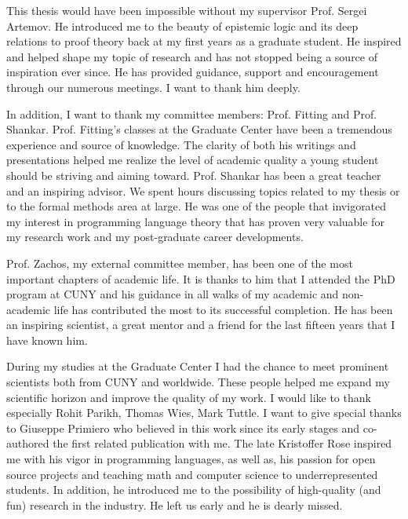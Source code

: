 This thesis would have been impossible without my supervisor Prof. Sergei Artemov.
He introduced me to the beauty of epistemic logic and its deep relations to proof theory
back at my first years as a graduate student. He inspired and helped shape my topic of research and 
has not stopped being a source of inspiration ever
since. He has provided guidance, support and encouragement through our numerous meetings. 
I want to thank him deeply.

In addition, I want to thank my committee members: Prof. Fitting and Prof. Shankar. Prof. Fitting's classes
 at the Graduate Center have been a tremendous experience and source of knowledge.
The clarity of  both his writings and presentations helped me realize the 
level of academic quality a young student should be striving and aiming toward. Prof. Shankar has
been a great teacher and an inspiring advisor. We spent hours 
discussing topics related to my thesis or to the formal methods area at large. He was one
of the people that invigorated my interest in programming language theory that has
proven very valuable for my research work and my post-graduate career developments.

Prof. Zachos, my external committee member, has been one of the most important
chapters of academic life. It is thanks to him that I attended the PhD program at CUNY
and his guidance in all walks of my academic and non-academic life has contributed 
the most  to its successful completion. He has been an inspiring
scientist, a great mentor and a friend for the last fifteen years that I have 
known him. 


During my studies at the Graduate Center I had the chance to meet 
prominent scientists both from CUNY and worldwide. 
These people helped me expand my scientific horizon and improve
the quality of my work. I would like to thank especially Rohit Parikh, Thomas Wies,  
 Mark Tuttle. I want to give special thanks to Giuseppe Primiero who believed in this work
 since its early stages and co-authored the first related publication with me. 
 The late Kristoffer Rose inspired me with his vigor in programming languages, as well as, his passion
 for open source projects and teaching math and computer science to underrepresented students. 
 In addition, he introduced me to the possibility of high-quality (and fun) research in the industry. 
 He left us early and he is dearly missed.

